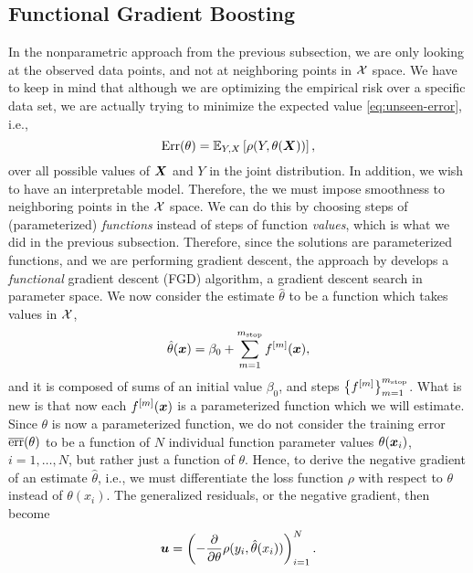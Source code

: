 \subsection{Functional Gradient Boosting}\label{sec:FGD}
In the nonparametric approach from the previous subsection, we are only looking at the observed data points, and not at neighboring points in $\mathcal{X}$ space.
We have to keep in mind that although we are optimizing the empirical risk over a specific data set, we are actually trying to minimize the expected value \eqref{eq:unseen-error}, i.e.,
\begin{equation*}
    \text{Err}(\theta)=\mathbb{E}_{Y,X}\left[\rho(Y,\theta(\bm{X}))\right],
\end{equation*}
over all possible values of $\bm{X}$ and $Y$ in the joint distribution.
In addition, we wish to have an interpretable model.
Therefore, the we must impose smoothness to neighboring points in the $\mathcal{X}$ space.
We can do this by choosing steps of (parameterized) \textit{functions} instead of steps of function \textit{values}, which is what we did in the previous subsection.
Therefore, since the solutions are parameterized functions, and we are performing gradient descent, the approach by \citet{friedman2001} develops a \textit{functional} gradient descent (FGD) algorithm, a gradient descent search in parameter space.
We now consider the estimate $\hat{\theta}$ to be a function which takes values in $\mathcal{X}$,
\begin{equation*}
    \hat{\theta}(\bm{x})=\beta_0+\sum_{m=1}^{m_{\text{stop}}}f^{[m]}(\bm{x}),
\end{equation*}
and it is composed of sums of an initial value $\beta_0$, and steps $\left\{f^{[m]}\right\}_{m=1}^{m_{\text{stop}}}$.
What is new is that now each $f^{[m]}(\bm{x})$ is a parameterized function which we will estimate.
Since $\theta$ is now a parameterized function, we do not consider the training error $\overline{\text{err}}(\theta)$ to be a function of $N$ individual function parameter values $\theta(\bm{x}_i)$, $i=1,\ldots,N$, but rather just a function of $\theta$.
Hence, to derive the negative gradient of an estimate $\hat{\theta}$, i.e., we must differentiate the loss function $\rho$ with respect to $\theta$ instead of $\theta(x_i)$.
The generalized residuals, or the negative gradient, then become
\begin{equation*}
    \bm{u}=\left(-\frac{\partial}{\partial \theta}\rho(y_i, \hat{\theta}(x_i))\right)_{i=1}^N.
\end{equation*}
